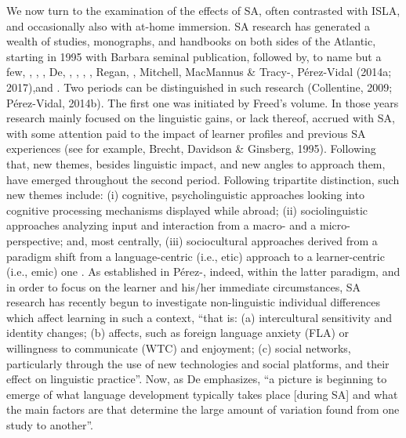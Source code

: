 We now turn to the examination of the effects of SA, often contrasted with ISLA, and occasionally also with at-home immersion. SA research has generated a wealth of studies,  monographs, and handbooks on both sides of the Atlantic, starting in 1995 with Barbara  seminal publication, followed by, to name but a few, \citet{CollentineFreed2004a}, \citet{Pellegrino2005}, \citet{DufonChurchill2006}, De\citet{Keyser2007}, \citet{Collentine2009}, \citet{Kinginger2009}, \citet{Jackson2013}, \citet{LlanesMuñoz2013}, Regan, \citet{HowardLemée2009}, Mitchell, MacMannus \& Tracy-\citet{Ventura2015}, Pérez-Vidal (2014a; 2017),and \citet{SanzMorales2018}. Two periods can be distinguished in such research (Collentine, 2009; Pérez-Vidal, 2014b). The first one was initiated by Freed’s volume. In those years research mainly focused on the linguistic gains, or lack thereof, accrued with SA, with some attention paid to the impact of learner profiles and previous SA experiences (see for example, Brecht, Davidson \& Ginsberg, 1995). Following that, new themes, besides linguistic impact, and new angles to approach them, have emerged throughout the second period. Following  tripartite distinction, such new themes include: (i) cognitive, psycholinguistic approaches looking into cognitive processing mechanisms displayed while abroad; (ii) sociolinguistic approaches analyzing input and interaction from a macro- and a micro-perspective; and, most centrally, (iii) sociocultural approaches derived from a paradigm shift from a language-centric (i.e., etic) approach to a learner-centric (i.e., emic) one \citep{Devlin2014}. As established in Pérez-\citet[341]{Vidal2017}, indeed, within the latter paradigm, and in order to focus on the learner and his/her immediate circumstances, SA research has recently begun to investigate non-linguistic individual differences which affect learning in such a context, “that is: (a) intercultural sensitivity and identity changes; (b) affects, such as foreign language anxiety (FLA) or willingness to communicate (WTC) and enjoyment; (c) social networks, particularly through the use of new technologies and social platforms, and their effect on linguistic practice”. Now, as De\citet[313]{Keyser2014} emphasizes, “a picture is beginning to emerge of what language development typically takes place [during SA] and what the main factors are that determine the large amount of variation found from one study to another”. 

